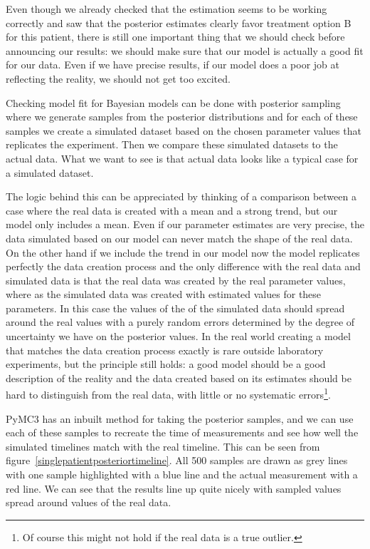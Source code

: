 \documentclass[12pt,a4paper,leqno]{report}
\theoremstyle{plain}
\theoremstyle{definition}
\theoremstyle{remark}
\begin{document}
Even though we already checked that the estimation seems to be working correctly and saw
that the posterior estimates clearly favor treatment option B for this patient, there is
still one important thing that we should check before announcing our results: we should
make sure that our model is actually a good fit for our data. Even if we have precise
results, if our model does a poor job at reflecting the
reality, we should not get too excited.

Checking model fit for Bayesian models can be done with posterior sampling where we generate samples from
the posterior distributions and for each of these samples we create a simulated dataset based
on the chosen parameter values that replicates the experiment. Then we compare these
simulated datasets to the actual
data. What we want to see is that actual data looks like a typical case for a simulated
dataset.

The logic behind this can be appreciated by thinking of a comparison between a case
where the real data is created with a mean and a strong trend, but our model only includes a
mean. Even if our parameter estimates are very precise, the data simulated based on our
model can never match the shape of the real data. On the other hand if we include the trend in our
model now the model replicates perfectly the data creation process and
the only difference with the real data and simulated data is that the real data was
created by the real parameter values, where as the simulated data was created with
estimated values for these parameters. In this case the values of the of the simulated data
should spread around the real values with a purely random errors determined by the degree
of uncertainty we have on the posterior values. In the real world creating a model that
matches the data creation process exactly is rare outside laboratory experiments, but
the principle still holds: a good model should be a good description of the reality and
the data created based on its estimates should be hard to distinguish from the real
data, with little or no systematic errors\footnote{Of course this might not hold if the
real data is a true outlier.}.

PyMC3 has an inbuilt method for taking the posterior samples, and we can use each of
these samples to recreate the time of measurements and see how well the simulated
timelines match with the real timeline. This can be seen from figure\ \ref{singlepatientposteriortimeline}.
All 500 samples are drawn as grey lines with one sample highlighted with a blue line and
the actual measurement with a red line. We can see that the results line up quite
nicely with sampled values spread around values of the real data.
\end{document}
